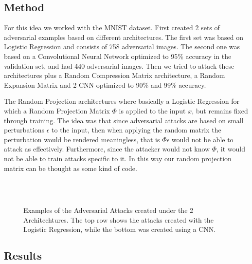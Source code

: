 \documentclass{asaproc}
\begin{document}
\subsection*{Method}

For this idea we worked with the MNIST dataset. First created 2 sets of adversarial examples based on different architectures. The first set was based on Logistic Regression and consists of 758 adversarial images. The second one was based on a Convolutional Neural Network optimized to 95\% accuracy in the validation set, and had 440 adversarial images. Then we tried to attack these architectures plus a Random Compression Matrix architecture, a Random Expansion Matrix and 2 CNN optimized to 90\% and 99\% accuracy.

The Random Projection architectures where basically a Logistic Regression for which a Random Projection Matrix $ \Phi $ is applied to the input $ x $, but remains fixed through training. The idea was that since adversarial attacks are based on small perturbations $ \epsilon $ to the input, then when applying the random matrix the perturbation would be rendered meaningless, that is $ \Phi \epsilon $ would not be able to attack as effectively. Furthermore, since the attacker would not know $ \Phi $, it would not be able to train attacks specific to it. In this way our random projection matrix can be thought as some kind of code.

\begin{figure}[h!]
	\centering
	\caption{\enspace Examples of the Adversarial Attacks created under the 2 Architechtures. The top row shows the attacks created with the Logistic Regression, while the bottom was created using a CNN.}
	   \\
	   \\
	\label{fig1}
\end{figure}


\subsection*{Results}
\end{document}
